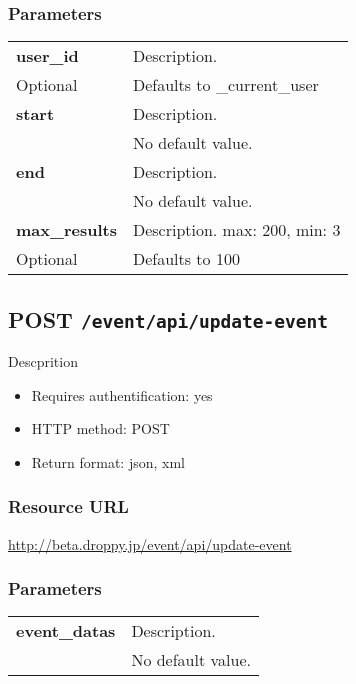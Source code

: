 \documentclass[11pt,a4paper]{article}
\newcommand{\content}[1]{\begin{minipage}{10cm}\vspace{2mm}#1\vspace{2mm}\end{minipage}}
\begin{document}
  \subsubsection*{Parameters}
  \begin{table}[h]
    \begin{center}
      \begin{tabular}{l l}
        \hline 
      \textbf{user\_id} & \content{Description. }
      \\
      Optional & Defaults to \_current\_user\\
      \hline
      \textbf{start} & \content{Description. }
      \\
       & No default value.\\
      \hline
      \textbf{end} & \content{Description. }
      \\
       & No default value.\\
      \hline
      \textbf{max\_results} & \content{Description. max: 200, min: 3}
      \\
      Optional & Defaults to 100\\
      \hline
      \end{tabular}
    \end{center}
  \end{table}
  
      \newpage
      
      
  \subsection*{POST {\tt /event/api/update-event}}
  Descprition
  \begin{itemize}
  \item Requires authentification: yes
  \item HTTP method: POST
  \item Return format: json, xml
  \end{itemize}
  \subsubsection*{Resource URL}
  \url{http://beta.droppy.jp/event/api/update-event}
  \subsubsection*{Parameters}
  \begin{table}[h]
    \begin{center}
      \begin{tabular}{l l}
        \hline 
      \textbf{event\_datas} & \content{Description. }
      \\
       & No default value.\\
      \hline
      \end{tabular}
    \end{center}
  \end{table}
  
\end{document}
